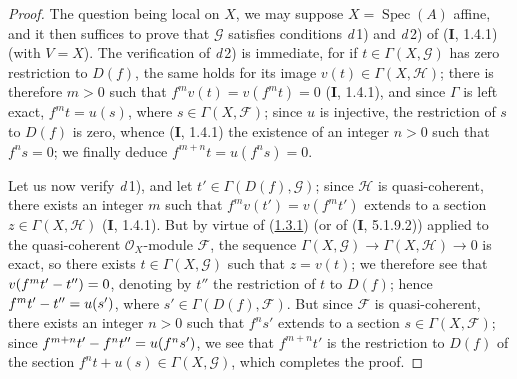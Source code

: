 \begin{proof}
The question being local on $X$, we may suppose
$X=\operatorname{Spec}(A)$ affine, and it then suffices to prove that
$\mathcal G$ satisfies conditions \textit{d}\,1) and \textit{d}\,2) of (\textbf{I}, 1.4.1) (with
$V=X$). The verification of \textit{d}\,2) is immediate, for if
$t\in\Gamma(X,\mathcal G)$ has zero restriction to $D(f)$, the same holds
for its image $v(t)\in\Gamma(X,\mathcal H)$; there is therefore $m>0$ such
that $f^mv(t)=v(f^mt)=0$ (\textbf{I}, 1.4.1), and since $\Gamma$ is left exact,
$f^mt=u(s)$, where $s\in\Gamma(X,\mathcal F)$; since $u$ is injective, the
restriction of $s$ to $D(f)$ is zero, whence (\textbf{I}, 1.4.1) the existence of an
integer $n>0$ such that $f^ns=0$; we finally deduce
$f^{m+n}t=u(f^ns)=0$.

Let us now verify \textit{d}\,1), and let $t'\in\Gamma(D(f),\mathcal G)$; since
$\mathcal H$ is quasi-coherent, there exists an integer $m$ such that
$f^mv(t')=v(f^mt')$ extends to a section
$z\in\Gamma(X,\mathcal H)$ (\textbf{I}, 1.4.1). But by virtue of
(\hyperref[III.1.3.1]{1.3.1}) (or of (\textbf{I}, 5.1.9.2)) applied to the
quasi-coherent $\mathcal O_X$-module $\mathcal F$, the sequence
$\Gamma(X,\mathcal G)\to\Gamma(X,\mathcal H)\to0$ is exact, so there exists
$t\in\Gamma(X,\mathcal G)$ such that $z=v(t)$; we therefore see that
$v(f^mt'- t'')=0$, denoting by $t''$ the restriction of $t$ to $D(f)$;
hence $f^mt'- t''=u(s')$, where $s'\in\Gamma(D(f),\mathcal F)$. But since
$\mathcal F$ is quasi-coherent, there exists an integer $n>0$ such that $f^ns'$
extends to a section $s\in\Gamma(X,\mathcal F)$; since
$f^{m+n}t'- f^nt''=u(f^ns')$, we see that $f^{m+n}t'$ is the restriction to
$D(f)$ of the section $f^nt+u(s)\in\Gamma(X,\mathcal G)$, which completes
the proof.
\end{proof}

